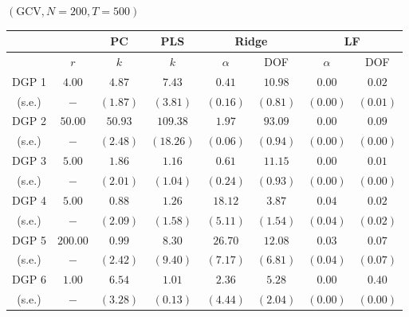 
    \begin{center} $(\mathrm{GCV}, N=200, T=500)$ \
        \begin{tabular}{cccccccc}
            \hline \hline 
            & & PC & PLS & \multicolumn{2}{c}{Ridge} & \multicolumn{2}{c}{LF} \\
            \hline 
            & $r$ & $k$ & $k$ & $\alpha$ & DOF & $\alpha$ & DOF \\
            \hline 
            DGP 1 & $4.00$ & $4.87$ & $7.43$ & $0.41$ & $10.98$ & $0.00$ & $0.02$ \\
            (s.e.) & $-$ & $(1.87)$ & $(3.81)$ & $(0.16)$ & $(0.81)$ & $(0.00)$ & $(0.01)$ \\
            DGP 2 & $50.00$ & $50.93$ & $109.38$ & $1.97$ & $93.09$ & $0.00$ & $0.09$ \\
            (s.e.) & $-$ & $(2.48)$ & $(18.26)$ & $(0.06)$ & $(0.94)$ & $(0.00)$ & $(0.00)$ \\
            DGP 3 & $5.00$ & $1.86$ & $1.16$ & $0.61$ & $11.15$ & $0.00$ & $0.01$ \\
            (s.e.) & $-$ & $(2.01)$ & $(1.04)$ & $(0.24)$ & $(0.93)$ & $(0.00)$ & $(0.00)$ \\
            DGP 4 & $5.00$ & $0.88$ & $1.26$ & $18.12$ & $3.87$ & $0.04$ & $0.02$ \\
            (s.e.) & $-$ & $(2.09)$ & $(1.58)$ & $(5.11)$ & $(1.54)$ & $(0.04)$ & $(0.02)$ \\
            DGP 5 & $200.00$ & $0.99$ & $8.30$ & $26.70$ & $12.08$ & $0.03$ & $0.07$ \\
            (s.e.) & $-$ & $(2.42)$ & $(9.40)$ & $(7.17)$ & $(6.81)$ & $(0.04)$ & $(0.07)$ \\
            DGP 6 & $1.00$ & $6.54$ & $1.01$ & $2.36$ & $5.28$ & $0.00$ & $0.40$ \\
            (s.e.) & $-$ & $(3.28)$ & $(0.13)$ & $(4.44)$ & $(2.04)$ & $(0.00)$ & $(0.00)$ \\
            \hline
        \end{tabular}
    \end{center}
    